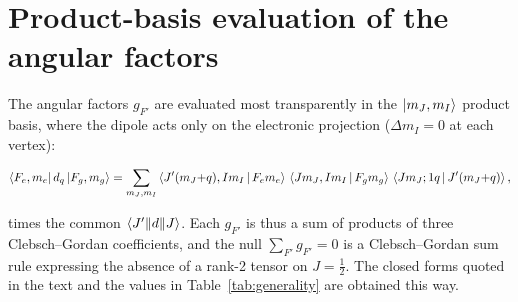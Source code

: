 \documentclass[aps,pra,reprint,amsmath,amssymb,superscriptaddress,floatfix]{revtex4-2}
\begin{document}
\section{Product-basis evaluation of the angular factors}\label{app:angular}
The angular factors $g_{F'}$ are evaluated most transparently in the
$\ket{m_J,m_I}$ product basis, where the dipole acts only on the electronic projection
($\Delta m_I=0$ at each vertex):
\begin{widetext}
\begin{equation}
\bra{F_e,m_e}d_q\ket{F_g,m_g}=\sum_{m_J,m_I}
\Braket{J' (m_J{+}q),I m_I | F_e m_e}\,
\Braket{J m_J,I m_I | F_g m_g}\,
\Braket{J m_J;1 q | J'(m_J{+}q)},
\end{equation}
\end{widetext}
times the common $\braket{J'\Vert d\Vert J}$. Each $g_{F'}$ is thus a sum of products of three
Clebsch--Gordan coefficients, and the null $\sum_{F'}g_{F'}=0$ is a Clebsch--Gordan sum rule
expressing the absence of a rank-2 tensor on $J=\tfrac12$. The closed forms quoted in the text and
the values in Table~\ref{tab:generality} are obtained this way.


\end{document}
